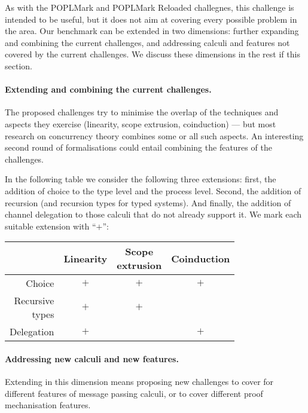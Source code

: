\documentclass[runningheads]{llncs}
\begin{document}
As with the POPLMark and POPLMark Reloaded challegnes, this challenge is
intended to be useful, but it does not aim at covering every possible
problem in the area. Our benchmark can be extended in two
dimensions: further expanding and combining the current challenges,
and addressing calculi and features not covered by the current challenges.
We discuss these dimensions in the rest if this section.

\paragraph{Extending and combining the current challenges.}
The proposed challenges try to minimise the overlap of the techniques
and aspects they exercise (linearity, scope extrusion, coinduction) --- but most
research on concurrency theory combines some or all such aspects. An interesting second round of formalisations could
entail combining the features of the challenges.

In the following table we consider the following three extensions: first, the
addition of choice to the type level and the process level. Second, the addition
of recursion (and recursion types for typed systems). And finally, the
addition of channel delegation to those calculi that do not already
support it.  We mark each suitable extension with ``$+$'':

\vspace{.5em}

\begin{center}\small
  \begin{tabular}{|r|c|c|c|}
    \hline
    & Linearity & \shortstack{Scope \\ extrusion} & Coinduction \\
    \hline
    Choice & $+$ & $+$  & $+$ \\
    \hline
    \shortstack{Recursive \\ types} & $+$  & $+$ & \\
    \hline
    Delegation & $+$ & & $+$ \\
    \hline
  \end{tabular}
\end{center}

\vspace{.5em}

\paragraph{Addressing new calculi and new features.}
Extending in this dimension
means proposing new challenges to cover for different features of
message passing calculi, or to cover different proof mechanisation features.
\end{document}
